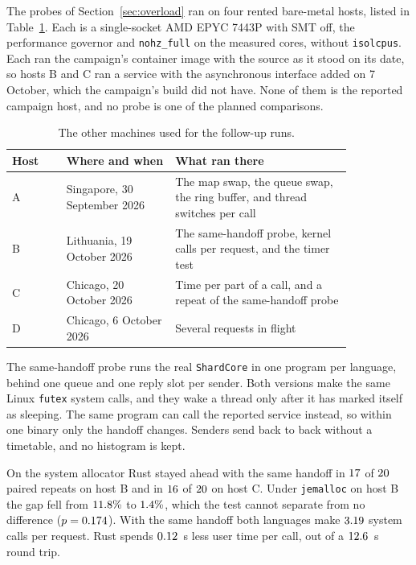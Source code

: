 \documentclass[english,oneside,a4paper,censored,csm,software-track-2020]{HYthesisML}
\begin{document}
\begin{appendices}
The probes of Section~\ref{sec:overload} ran on four rented bare-metal hosts,
listed in Table~\ref{tab:probehosts}. Each is a single-socket AMD EPYC 7443P
with SMT off, the performance governor and \texttt{nohz\_full} on the measured
cores, without \texttt{isolcpus}. Each ran the campaign's container image with the source as
it stood on its date, so hosts B and C ran a service with the asynchronous interface added on
7 October, which the campaign's build did not have.
None of them is the reported campaign host, and no probe is one of the
planned comparisons.

\begin{table}[!ht]
\centering
\small
\caption[The other machines used for the follow-up runs]{The other machines used for the follow-up runs.\label{tab:probehosts}}
\renewcommand{\arraystretch}{1.2}
\setlength{\tabcolsep}{6pt}
\begin{tabular}{@{}l>{\raggedright\arraybackslash}p{0.32\linewidth}%
>{\raggedright\arraybackslash}p{0.52\linewidth}@{}}
\hline\hline
Host & Where and when & What ran there \\
\hline
A & Singapore, 30 September 2026 & The map swap, the queue swap, the ring
buffer, and thread switches per call \\
B & Lithuania, 19 October 2026 & The same-handoff probe, kernel calls per
request, and the timer test \\
C & Chicago, 20 October 2026 & Time per part of a call, and a repeat of the
same-handoff probe \\
D & Chicago, 6 October 2026 & Several requests in flight \\
\hline
\end{tabular}
\end{table}

The same-handoff probe runs the real \texttt{ShardCore} in one program per
language, behind one queue and one reply slot per sender. Both versions make
the same Linux \texttt{futex} system calls, and they wake a thread only after
it has marked itself as sleeping. The same program can call the reported
service instead, so within one binary only the handoff changes. Senders send
back to back without a timetable, and no histogram is kept.

On the system allocator Rust stayed ahead with the same handoff in
$17$ of $20$ paired repeats on host B and in
$16$ of $20$ on host C. Under
\texttt{jemalloc} on host B the gap fell from $11.8\%$
to $1.4\%$, which the test cannot separate from no
difference ($p = 0.174$). With the same handoff both
languages make $3.19$ system calls per request. Rust spends
$0.12$~\textmu s less user time per call, out of a
$12.6$~\textmu s round trip.


\end{appendices}
\end{document}
